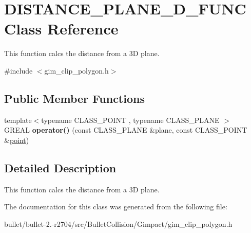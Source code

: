 \hypertarget{class_d_i_s_t_a_n_c_e___p_l_a_n_e__3_d___f_u_n_c}{\section{D\+I\+S\+T\+A\+N\+C\+E\+\_\+\+P\+L\+A\+N\+E\+\_\+D\+\_\+\+F\+U\+N\+C Class Reference}
\label{class_d_i_s_t_a_n_c_e___p_l_a_n_e__3_d___f_u_n_c}
}


This function calcs the distance from a 3\+D plane.  




{\ttfamily \#include $<$gim\+\_\+clip\+\_\+polygon.\+h$>$}

\subsection*{Public Member Functions}
\begin{DoxyCompactItemize}
\item 
\hypertarget{class_d_i_s_t_a_n_c_e___p_l_a_n_e__3_d___f_u_n_c_a74c4f415c83fe6dd0665188b344dccdd}{{\footnotesize template$<$typename C\+L\+A\+S\+S\+\_\+\+P\+O\+I\+N\+T , typename C\+L\+A\+S\+S\+\_\+\+P\+L\+A\+N\+E $>$ }\\G\+R\+E\+A\+L {\bfseries operator()} (const C\+L\+A\+S\+S\+\_\+\+P\+L\+A\+N\+E \&plane, const C\+L\+A\+S\+S\+\_\+\+P\+O\+I\+N\+T \&\hyperlink{structpoint}{point})}\label{class_d_i_s_t_a_n_c_e___p_l_a_n_e__3_d___f_u_n_c_a74c4f415c83fe6dd0665188b344dccdd}

\end{DoxyCompactItemize}


\subsection{Detailed Description}
This function calcs the distance from a 3\+D plane. 

The documentation for this class was generated from the following file\+:\begin{DoxyCompactItemize}
\item 
bullet/bullet-\/2.-\/r2704/src/\+Bullet\+Collision/\+Gimpact/gim\+\_\+clip\+\_\+polygon.\+h\end{DoxyCompactItemize}
